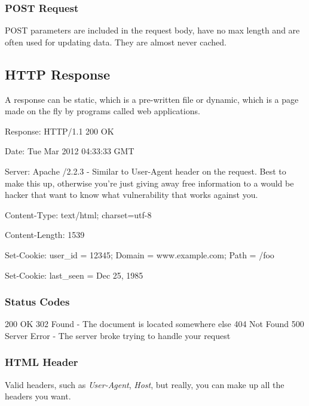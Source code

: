 \documentclass[12pt]{article}
\begin{document}
\subsubsection{POST Request}

POST parameters are included in the request body, have no max length and are often used for updating data. They are almost never cached.

\subsection{HTTP Response}
A response can be static, which is a pre-written file or dynamic, which is a page made on the fly by programs called web applications.

\begin{list}{*}{
\setlength{\itemsep}{0pt}
\setlength{\parsep}{0pt}
\setlength{\topsep}{0pt}
\setlength{\partopsep}{0pt}
\setlength{\leftmargin}{2em}
\setlength{\labelwidth}{1.5em}
\setlength{\labelsep}{0.5em}
}
\item Response: HTTP/1.1 200 OK
\item Date: Tue Mar 2012 04:33:33 GMT
\item Server: Apache /2.2.3 - Similar to User-Agent header on the request. Best to make this up, otherwise you're just giving away free information to a would be hacker that want to know what vulnerability that works against you.
\item Content-Type: text/html; charset=utf-8
\item Content-Length: 1539
\item Set-Cookie: user\_id = 12345; Domain = www.example.com; Path = /foo
\item Set-Cookie: last\_seen = Dec 25, 1985
\end{list}

\subsubsection*{Status Codes}
200 OK
302 Found - The document is located somewhere else
404 Not Found
500 Server Error - The server broke trying to handle your request

\subsubsection*{HTML Header}
Valid headers, such as \emph{User-Agent}, \emph{Host}, but really, you can make up all the headers you want.
\end{document}
